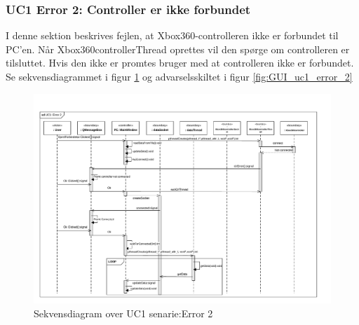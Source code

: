 \subsubsection{UC1 Error 2: Controller er ikke forbundet}
I denne sektion beskrives fejlen, at Xbox360-controlleren ikke er forbundet til PC'en. Når Xbox360controllerThread oprettes vil den spørge om controlleren er tilsluttet. Hvis den ikke er promtes bruger med at controlleren ikke er forbundet. Se sekvensdiagrammet i figur \ref{fig:cd_uc1_error_2} og advarselsskiltet i figur \ref{fig:GUI_uc1_error_2}

\begin{figure}[H]
\centering
\includegraphics[width=\textwidth* 1,height=\textwidth* 7/10 ]{../fig/diagrammer/pc/sd_uc1_Error_2.pdf}
\caption{Sekvensdiagram over UC1 senarie:Error 2}
\label{fig:cd_uc1_error_2}
\end{figure}

